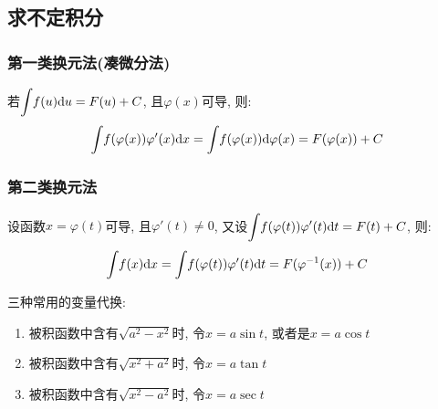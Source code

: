 \subsection{求不定积分}
\subsubsection{第一类换元法(凑微分法)}
若$ \displaystyle\int_{}\hspace{.2em}f(u)\mathrm{d}u=F(u)+C $, 且$ \varphi(x) $可导, 则:
\begin{equation*}
\displaystyle\int_{}\hspace{.2em}f(\varphi(x))\varphi'(x)\mathrm{d}x=\displaystyle\int_{}\hspace{.2em}f(\varphi(x))\mathrm{d}\varphi(x)=F(\varphi(x))+C
\end{equation*}
\subsubsection{第二类换元法}
设函数$ x=\varphi(t) $可导, 且$ \varphi'(t)\neq 0 $, 又设$ \displaystyle\int_{}\hspace{.2em}f(\varphi(t))\varphi'(t)\mathrm{d}t=F(t)+C $, 则:
\begin{equation*}
\displaystyle\int_{}\hspace{.2em}f(x)\mathrm{d}x=\displaystyle\int_{}\hspace{.2em}f(\varphi(t))\varphi'(t)\mathrm{d}t=F(\varphi^{-1}(x))+C
\end{equation*}
\begin{tcolorbox}
三种常用的变量代换:
\begin{enumerate}
\item 被积函数中含有$ \sqrt{a^{2}-x^{2}} $时, 令$ x=a\sin t $, 或者是$ x=a\cos t $
\item 被积函数中含有$ \sqrt{x^{2}+a^{2}} $时, 令$ x=a\tan t $
\item 被积函数中含有$ \sqrt{x^{2}-a^{2}} $时, 令$ x=a\sec t $
\end{enumerate}
\end{tcolorbox}
